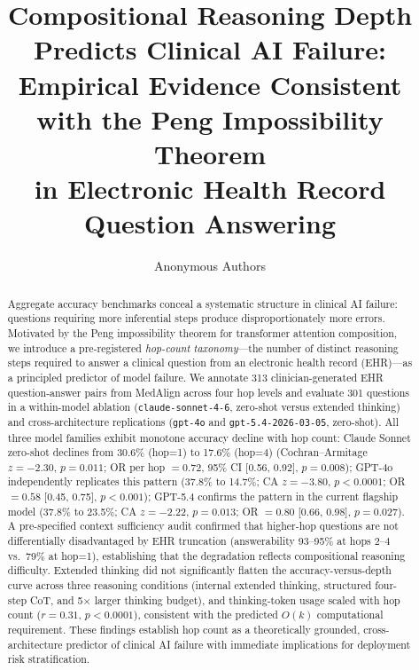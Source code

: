 \documentclass{article}
\title{Compositional Reasoning Depth Predicts Clinical AI Failure:\\
Empirical Evidence Consistent with the Peng Impossibility Theorem\\
in Electronic Health Record Question Answering}
\author{Anonymous Authors}
\begin{document}
\maketitle

\begin{abstract}
Aggregate accuracy benchmarks conceal a systematic structure in clinical AI failure:
questions requiring more inferential steps produce disproportionately more errors.
Motivated by the Peng impossibility theorem for transformer attention composition,
we introduce a pre-registered \emph{hop-count taxonomy}---the number of distinct
reasoning steps required to answer a clinical question from an electronic health
record (EHR)---as a principled predictor of model failure.
We annotate 313 clinician-generated EHR question-answer pairs from MedAlign
across four hop levels and evaluate 301 questions in a within-model ablation
(\texttt{claude-sonnet-4-6}, zero-shot versus extended thinking) and
cross-architecture replications (\texttt{gpt-4o} and \texttt{gpt-5.4-2026-03-05}, zero-shot).
All three model families exhibit monotone accuracy decline with hop count:
Claude Sonnet zero-shot declines from 30.6\% (hop=1) to 17.6\% (hop=4)
(Cochran--Armitage $z = -2.30$, $p = 0.011$; OR per hop $= 0.72$,
95\% CI [0.56, 0.92], $p = 0.008$); GPT-4o independently replicates this
pattern (37.8\% to 14.7\%; CA $z = -3.80$, $p < 0.0001$; OR $= 0.58$
[0.45, 0.75], $p < 0.001$); GPT-5.4 confirms the pattern in the current flagship model
(37.8\% to 23.5\%; CA $z = -2.22$, $p = 0.013$; OR $= 0.80$ [0.66, 0.98], $p = 0.027$).
A pre-specified context sufficiency audit confirmed that higher-hop questions
are not differentially disadvantaged by EHR truncation (answerability
93--95\% at hops 2--4 vs.\ 79\% at hop=1), establishing that the
degradation reflects compositional reasoning difficulty.
Extended thinking did not significantly flatten the accuracy-versus-depth curve
across three reasoning conditions (internal extended thinking, structured
four-step CoT, and 5$\times$ larger thinking budget), and thinking-token usage
scaled with hop count ($r = 0.31$, $p < 0.0001$), consistent with the
predicted $O(k)$ computational requirement.
These findings establish hop count as a theoretically grounded, cross-architecture
predictor of clinical AI failure with immediate implications for deployment
risk stratification.
\end{abstract}

\end{document}
